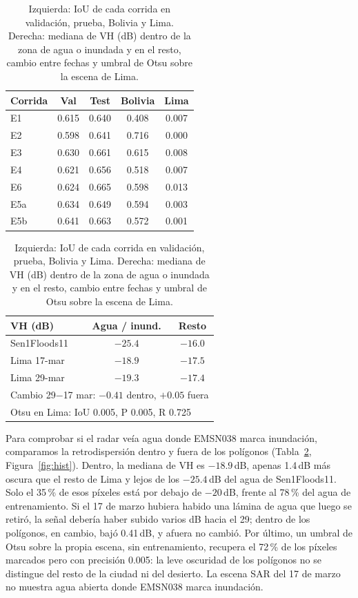 \documentclass[10pt]{article}
\begin{document}
\begin{table}[t]
\centering\small
\caption{Izquierda: IoU de cada corrida en validación, prueba, Bolivia y Lima. Derecha: mediana de VH (dB) dentro de la zona de agua o inundada y en el resto, cambio entre fechas y umbral de Otsu sobre la escena de Lima.}
\label{tab:limatodas}
\begin{minipage}[t]{0.50\linewidth}\centering\vspace{0pt}
\begin{tabular}{lcccc}
\toprule
\textbf{Corrida} & \textbf{Val} & \textbf{Test} & \textbf{Bolivia} & \textbf{Lima} \\
\midrule
E1 & 0.615 & 0.640 & 0.408 & 0.007 \\
E2 & 0.598 & 0.641 & 0.716 & 0.000 \\
E3 & 0.630 & 0.661 & 0.615 & 0.008 \\
E4 & 0.621 & 0.656 & 0.518 & 0.007 \\
E6 & 0.624 & 0.665 & 0.598 & 0.013 \\
E5a & 0.634 & 0.649 & 0.594 & 0.003 \\
E5b & 0.641 & 0.663 & 0.572 & 0.001 \\
\bottomrule
\end{tabular}
\end{minipage}\hfill
\begin{minipage}[t]{0.47\linewidth}\centering\vspace{0pt}
\begin{tabular}{lcc}
\toprule
\textbf{VH (dB)} & \textbf{Agua / inund.} & \textbf{Resto} \\
\midrule
Sen1Floods11 & $-25.4$ & $-16.0$ \\
Lima 17-mar & $-18.9$ & $-17.5$ \\
Lima 29-mar & $-19.3$ & $-17.4$ \\
\midrule
\multicolumn{3}{l}{Cambio 29$-$17 mar: $-0.41$ dentro, $+0.05$ fuera} \\
\multicolumn{3}{l}{Otsu en Lima: IoU 0.005, P 0.005, R 0.725} \\
\bottomrule
\end{tabular}
\end{minipage}
\end{table}

Para comprobar si el radar veía agua donde EMSN038 marca inundación, comparamos la retrodispersión dentro y fuera de los polígonos (Tabla~\ref{tab:limatodas}, Figura~\ref{fig:hist}). Dentro, la mediana de VH es $-18.9$\,dB, apenas 1.4\,dB más oscura que el resto de Lima y lejos de los $-25.4$\,dB del agua de Sen1Floods11. Solo el 35\,\% de esos píxeles está por debajo de $-20$\,dB, frente al 78\,\% del agua de entrenamiento. Si el 17 de marzo hubiera habido una lámina de agua que luego se retiró, la señal debería haber subido varios dB hacia el 29; dentro de los polígonos, en cambio, bajó 0.41\,dB, y afuera no cambió. Por último, un umbral de Otsu sobre la propia escena, sin entrenamiento, recupera el 72\,\% de los píxeles marcados pero con precisión 0.005: la leve oscuridad de los polígonos no se distingue del resto de la ciudad ni del desierto. La escena SAR del 17 de marzo no muestra agua abierta donde EMSN038 marca inundación.
\end{document}
